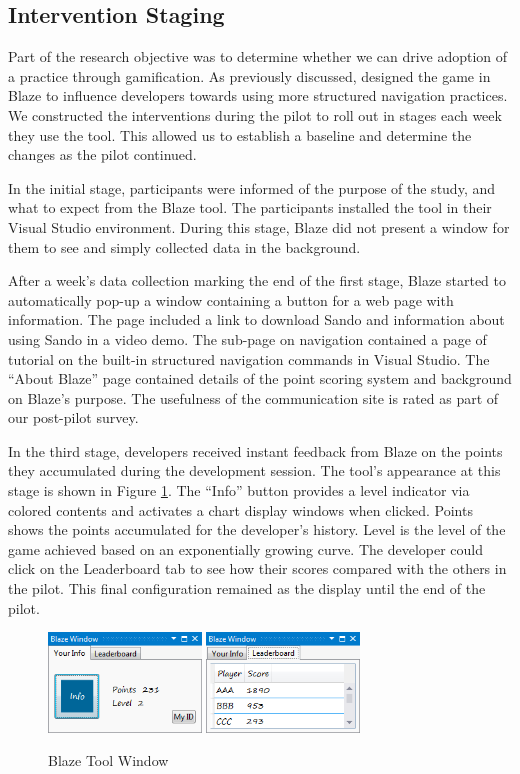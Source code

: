 \documentclass{sig-alternate}
\begin{document}
\subsection{Intervention Staging}

Part of the research objective was to determine whether we can drive adoption of a practice through gamification.  As previously discussed, designed the game in Blaze to influence developers towards using more structured navigation practices.  We constructed the interventions during the pilot to roll out in stages each week they use the tool.  This allowed us to establish a baseline and determine the changes as the pilot continued.

In the initial stage, participants were informed of the purpose of the study, and what to expect from the Blaze tool.  The participants installed the tool in their Visual Studio environment.  During this stage, Blaze did not present a window for them to see and simply collected data in the background.   

After a week's data collection marking the end of the first stage, Blaze started to automatically pop-up a window containing a button for a web page with information.  The page included a link to download Sando  and information about using Sando in a video demo.  The sub-page on navigation contained a page of tutorial on the built-in structured navigation commands in Visual Studio.  The ``About Blaze'' page contained details of the point scoring system and background on Blaze's purpose.  The usefulness of the communication site is rated as part of our post-pilot  survey.

In the third stage, developers received instant feedback from Blaze on the points they accumulated during the development session.  The tool's appearance at this stage is shown in Figure \ref{fig:blazeWindow}.  The ``Info'' button provides a level indicator via colored contents and activates a chart display windows when clicked.  Points shows the points accumulated for the developer's history.  Level is the level of the game achieved based on an exponentially growing curve.   The developer could click on the Leaderboard tab to see how their scores compared with the others in the pilot.  This final configuration remained as the display until the end of the pilot.  

\begin{figure}
	\centering
	\includegraphics[width=1.6in]{blazeWindow.png}
\includegraphics[width=1.6in]{blazeLeaderboard.png}
	\caption{Blaze Tool Window}
	\label{fig:blazeWindow}
\end{figure}
\end{document}
